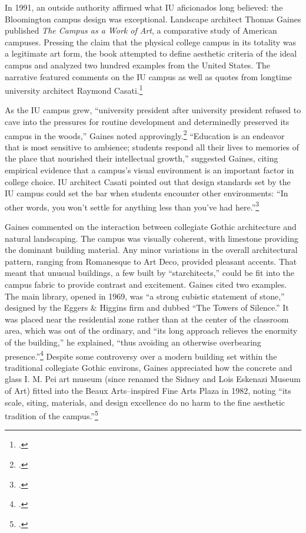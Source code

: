 \documentclass[
  american,
  letterpaper,
]{scrreprt}
\begin{document}
In 1991, an outside authority affirmed what IU aficionados long
believed: the Bloomington campus design was exceptional. Landscape
architect Thomas Gaines published \emph{The Campus as a Work of Art}, a
comparative study of American campuses. Pressing the claim that the
physical college campus in its totality was a legitimate art form, the
book attempted to define aesthetic criteria of the ideal campus and
analyzed two hundred examples from the United States. The narrative
featured comments on the IU campus as well as quotes from longtime
university architect Raymond Casati.\footnote{.}

As the IU campus grew, ``university president after university president
refused to cave into the pressures for routine development and
determinedly preserved its campus in the woods,'' Gaines noted
approvingly.\footnote{.} ``Education is
an endeavor that is most sensitive to ambience; students respond all
their lives to memories of the place that nourished their intellectual
growth,'' suggested Gaines, citing empirical evidence that a campus's
visual environment is an important factor in college choice. IU
architect Casati pointed out that design standards set by the IU campus
could set the bar when students encounter other environments: ``In other
words, you won't settle for anything less than you've had
here.''\footnote{.}

Gaines commented on the interaction between collegiate Gothic
architecture and natural landscaping. The campus was visually coherent,
with limestone providing the dominant building material. Any minor
variations in the overall architectural pattern, ranging from Romanesque
to Art Deco, provided pleasant accents. That meant that unusual
buildings, a few built by ``starchitects,'' could be fit into the campus
fabric to provide contrast and excitement. Gaines cited two examples.
The main library, opened in 1969, was ``a strong cubistic statement of
stone,'' designed by the Eggers \& Higgins firm and dubbed ``The Towers
of Silence.'' It was placed near the residential zone rather than at the
center of the classroom area, which was out of the ordinary, and ``its
long approach relieves the enormity of the building,'' he explained,
``thus avoiding an otherwise overbearing presence.''\footnote{.}
Despite some controversy over a modern building set within the
traditional collegiate Gothic environs, Gaines appreciated how the
concrete and glass I. M. Pei art museum (since renamed the Sidney and
Lois Eskenazi Museum of Art) fitted into the Beaux Arts--inspired Fine
Arts Plaza in 1982, noting ``its scale, siting, materials, and design
excellence do no harm to the fine aesthetic tradition of the
campus.''\footnote{.}
\end{document}
